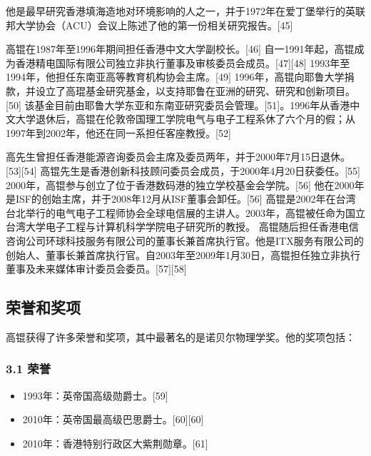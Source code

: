 他是最早研究香港填海造地对环境影响的人之一，并于1972年在爱丁堡举行的英联邦大学协会（ACU）会议上陈述了他的第一份相关研究报告。[45]

高锟在1987年至1996年期间担任香港中文大学副校长。[46] 自一1991年起，高锟成为香港精电国际有限公司独立非执行董事及审核委员会成员。[47][48] 1993年至1994年，他担任东南亚高等教育机构协会主席。[49] 1996年，高锟向耶鲁大学捐款，并设立了高琨基金研究基金，以支持耶鲁在亚洲的研究、研究和创新项目。[50] 该基金目前由耶鲁大学东亚和东南亚研究委员会管理。[51]。1996年从香港中文大学退休后，高锟在伦敦帝国理工学院电气与电子工程系休了六个月的假；从1997年到2002年，他还在同一系担任客座教授。[52]

高先生曾担任香港能源咨询委员会主席及委员两年，并于2000年7月15日退休。[53][54] 高锟先生是香港创新科技顾问委员会成员，于2000年4月20日获委任。[55] 2000年，高锟参与创立了位于香港数码港的独立学校基金会学院。[56] 他在2000年是ISF的创始主席，并于2008年12月从ISF董事会卸任。[56] 高锟是2002年在台湾台北举行的电气电子工程师协会全球电信展的主讲人。2003年，高锟被任命为国立台湾大学电子工程与计算机科学学院电子研究所的教授。 高锟随后担任香港电信咨询公司环球科技服务有限公司的董事长兼首席执行官。他是ITX服务有限公司的创始人、董事长兼首席执行官。自2003年至2009年1月30日，高锟担任独立非执行董事及未来媒体审计委员会委员。[57][58]

\subsection{荣誉和奖项}
高锟获得了许多荣誉和奖项，其中最著名的是诺贝尔物理学奖。他的奖项包括：
\subsubsection{3.1 荣誉}
\begin{itemize}
\item 1993年：英帝国高级勋爵士。[59]
\item 2010年：英帝国最高级巴思爵士。[60][60]
\item 2010年：香港特别行政区大紫荆勋章。[61]
\end{itemize}
